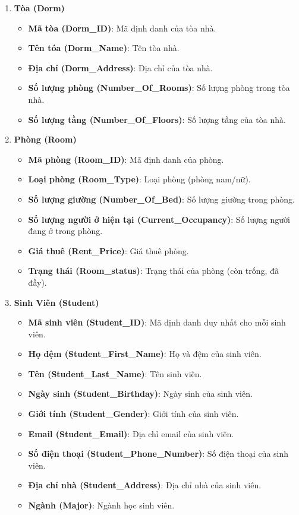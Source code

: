 \documentclass[a4paper,12pt]{article}
\begin{document}
\begin{enumerate}
    \item \textbf{Tòa (Dorm)}
    \begin{itemize}
        \item \textbf{Mã tòa (Dorm\_ID)}: Mã định danh của tòa nhà.
        \item \textbf{Tên tóa (Dorm\_Name)}: Tên tòa nhà.
        \item \textbf{Địa chỉ (Dorm\_Address)}: Địa chỉ của tòa nhà.
        \item \textbf{Số lượng phòng (Number\_Of\_Rooms)}: Số lượng phòng trong tòa nhà.
        \item \textbf{Số lượng tầng (Number\_Of\_Floors)}: Số lượng tầng của tòa nhà.
    \end{itemize}
    
    \item \textbf{Phòng (Room)}
    \begin{itemize}
        \item \textbf{Mã phòng (Room\_ID)}: Mã định danh của phòng.
        \item \textbf{Loại phòng (Room\_Type)}: Loại phòng (phòng nam/nữ).
        \item \textbf{Số lượng giường (Number\_Of\_Bed)}: Số lượng giường trong phòng.
        \item \textbf{Số lượng người ở hiện tại (Current\_Occupancy)}: Số lượng người đang ở trong phòng.
        \item \textbf{Giá thuê (Rent\_Price)}: Giá thuê phòng.
        \item \textbf{Trạng thái (Room\_status)}: Trạng thái của phòng (còn trống, đã đầy).
    \end{itemize}
    
    \item \textbf{Sinh Viên (Student)}
    \begin{itemize}
        \item \textbf{Mã sinh viên (Student\_ID)}: Mã định danh duy nhất cho mỗi sinh viên.
        \item \textbf{Họ đệm (Student\_First\_Name)}: Họ và đệm của sinh viên.
        \item \textbf{Tên (Student\_Last\_Name)}: Tên sinh viên.
        \item \textbf{Ngày sinh (Student\_Birthday)}: Ngày sinh của sinh viên.
        \item \textbf{Giới tính (Student\_Gender)}: Giới tính của sinh viên.
        \item \textbf{Email (Student\_Email)}: Địa chỉ email của sinh viên.
        \item \textbf{Số điện thoại (Student\_Phone\_Number)}: Số điện thoại của sinh viên.
        \item \textbf{Địa chỉ nhà (Student\_Address)}: Địa chỉ nhà của sinh viên.
        \item \textbf{Ngành (Major)}: Ngành học sinh viên.
    \end{itemize}
    

\end{enumerate}
\end{document}
